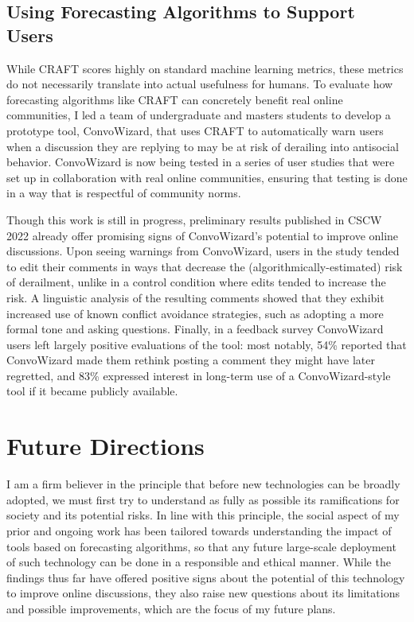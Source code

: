 \documentclass[12pt,letterpaper]{article}
\begin{document}
\subsection{Using Forecasting Algorithms to Support Users}
While CRAFT scores highly on standard machine learning metrics, these metrics do not necessarily translate into actual usefulness for humans.
To evaluate how forecasting algorithms like CRAFT can concretely benefit real online communities, I led a team of undergraduate and masters students to develop a prototype tool, ConvoWizard, that uses CRAFT to automatically warn users when a discussion they are replying to may be at risk of derailing into antisocial behavior.
ConvoWizard is now being tested in a series of user studies that were set up in collaboration with real online communities, ensuring that testing is done in a way that is respectful of community norms.

Though this work is still in progress, preliminary results published in CSCW 2022 \cite{chang_thread_2022} already offer promising signs of ConvoWizard's potential to improve online discussions.
Upon seeing warnings from ConvoWizard, users in the study tended to edit their comments in ways that decrease the (algorithmically-estimated) risk of derailment, unlike in a control condition where edits tended to increase the risk.
A linguistic analysis of the resulting comments showed that they exhibit increased use of known conflict avoidance strategies, such as adopting a more formal tone and asking questions.
Finally, in a feedback survey ConvoWizard users left largely positive evaluations of the tool: most notably, 54\% reported that ConvoWizard made them rethink posting a comment they might have later regretted, and 83\% expressed interest in long-term use of a ConvoWizard-style tool if it became publicly available.

\section{Future Directions}
I am a firm believer in the principle that before new technologies can be broadly adopted, we must first try to understand as fully as possible its ramifications for society and its potential risks.
In line with this principle, the social aspect of my prior and ongoing work has been tailored towards understanding the impact of tools based on forecasting algorithms, so that any future large-scale deployment of such technology can be done in a responsible and ethical manner.
While the findings thus far have offered positive signs about the potential of this technology to improve online discussions, they also raise new questions about its limitations and possible improvements, which are the focus of my future plans.
\end{document}
